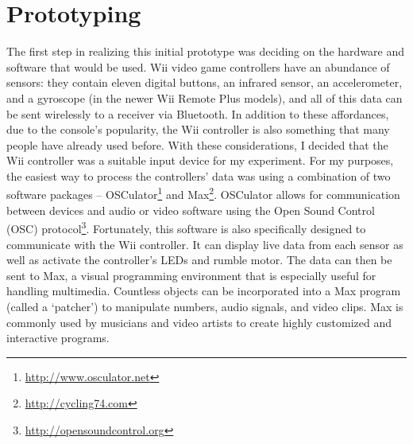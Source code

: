 

\section{Prototyping}

The first step in realizing this initial prototype was deciding on the hardware and software that would be used. Wii video game controllers have an abundance of sensors: they contain eleven digital buttons, an infrared sensor, an accelerometer, and a gyroscope (in the newer Wii Remote Plus models), and all of this data can be sent wirelessly to a receiver via Bluetooth. In addition to these affordances, due to the console's popularity, the Wii controller is also something that many people have already used before. With these considerations, I decided that the Wii controller was a suitable input device for my experiment. For my purposes, the easiest way to process the controllers' data was using a combination of two software packages -- OSCulator\footnote{\url{http://www.osculator.net}} and Max\footnote{\url{http://cycling74.com}}. OSCulator allows for communication between devices and audio or video software using the Open Sound Control (OSC) protocol\footnote{\url{http://opensoundcontrol.org}}. Fortunately, this software is also specifically designed to communicate with the Wii controller. It can display live data from each sensor as well as activate the controller's LEDs and rumble motor. The data can then be sent to Max, a visual programming environment that is especially useful for handling multimedia. Countless objects can be incorporated into a Max program (called a `patcher') to manipulate numbers, audio signals, and video clips. Max is commonly used by musicians and video artists to create highly customized and interactive programs.

